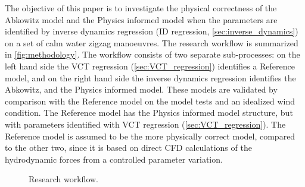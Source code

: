 The objective of this paper is to investigate the physical correctness of the Abkowitz model and the Physics informed model when the parameters are identified by inverse dynamics regression (ID regression, \autoref{sec:inverse_dynamics}) on a set of calm water zigzag manoeuvres. 
%
The research workflow is summarized in \autoref{fig:methodology}. The workflow consists of two separate sub-processes: on the left hand side the VCT regression (\autoref{sec:VCT_regression}) identifies a Reference model, and on the right hand side the inverse dynamics regression identifies the Abkowitz, and the Physics informed model.
These models are validated by comparison with the Reference model on the model tests and an idealized wind condition.
The Reference model has the Physics informed model structure, but with parameters identified with VCT regression (\autoref{sec:VCT_regression}). 
The Reference model is assumed to be the more physically correct model, compared to the other two, since it is based on direct CFD calculations of the hydrodynamic forces from a controlled parameter variation.
%
\begin{figure}[h]
    \centering
    
    \caption{Research workflow.}
    \label{fig:methodology}
\end{figure}
%
